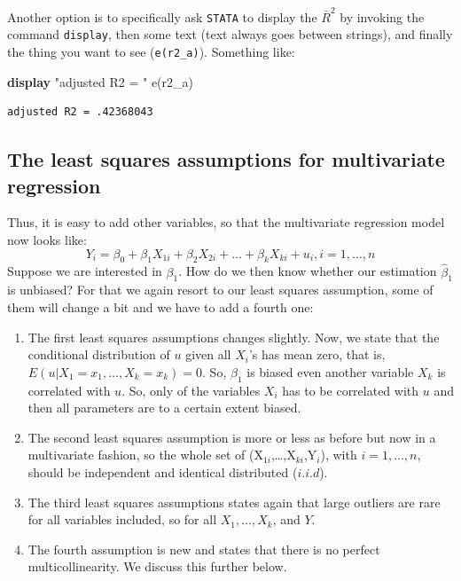 \documentclass[
]{book}
\newenvironment{Shaded}{\begin{snugshade}}{\end{snugshade}}
\newcommand{\FunctionTok}[1]{\textcolor[rgb]{0.00,0.00,0.00}{#1}}
\newcommand{\KeywordTok}[1]{\textcolor[rgb]{0.13,0.29,0.53}{\textbf{#1}}}
\newcommand{\NormalTok}[1]{#1}
\newcommand{\StringTok}[1]{\textcolor[rgb]{0.31,0.60,0.02}{#1}}
\providecommand{\tightlist}{%
  \setlength{\itemsep}{0pt}\setlength{\parskip}{0pt}}
\begin{document}
Another option is to specifically ask \texttt{STATA} to display the \(\bar{R}^2\) by invoking the command \texttt{display}, then some text (text always goes between strings), and finally the thing you want to see (\texttt{e(r2\_a)}). Something like:

\begin{Shaded}
\begin{Highlighting}[]
\KeywordTok{display} \StringTok{"adjusted R2 = "} \FunctionTok{e}\NormalTok{(r2\_a)}
\end{Highlighting}
\end{Shaded}

\begin{verbatim}
adjusted R2 = .42368043
\end{verbatim}

\hypertarget{the-least-squares-assumptions-for-multivariate-regression}{%
\subsection{The least squares assumptions for multivariate regression}\label{the-least-squares-assumptions-for-multivariate-regression}}

Thus, it is easy to add other variables, so that the multivariate regression model now looks like:
\begin{equation}
Y_i = \beta_0 + \beta_1 X_{1i} + \beta_2 X_{2i}+\ldots + \beta_k X_{ki}+u_i, i=1,\ldots,n
\end{equation}
Suppose we are interested in \(\beta_1\). How do we then know whether our estimation \(\hat{\beta}_1\) is unbiased? For that we again resort to our least squares assumption, some of them will change a bit and we have to add a fourth one:

\begin{enumerate}
\def\labelenumi{\arabic{enumi}.}
\tightlist
\item
  The first least squares assumptions changes slightly. Now, we state that the conditional distribution of \(u\) given all \(X_i\)'s has mean zero, that is, \(E(u|X_1 = x_1,\ldots, X_k = x_k) = 0\). So, \(\beta_1\) is biased even another variable \(X_k\) is correlated with \(u\). So, only of the variables \(X_i\) has to be correlated with \(u\) and then all parameters are to a certain extent biased.
\item
  The second least squares assumption is more or less as before but now in a multivariate fashion, so the whole set of (X\(_{1i}\),\ldots,X\(_{ki}\),Y\(_i\)), with \(i =1,\ldots,n\), should be independent and identical distributed (\(i.i.d\)).
\item
  The third least squares assumptions states again that large outliers are rare for all variables included, so for all \(X_1,\ldots, X_k\), and \(Y\).
\item
  The fourth assumption is new and states that there is no perfect multicollinearity. We discuss this further below.
\end{enumerate}
\end{document}
